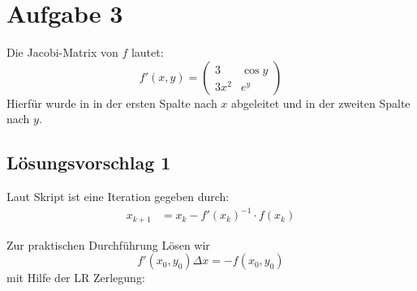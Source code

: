 \section*{Aufgabe 3}
Die Jacobi-Matrix von $f$ lautet:
\[f' (x,y) = \begin{pmatrix}
	3     & \cos y\\
	3 x^2 & e^y
\end{pmatrix}\]
Hierfür wurde in in der ersten Spalte nach $x$ abgeleitet und in der
zweiten Spalte nach $y$.

\subsection*{Lösungsvorschlag 1}
Laut Skript ist eine Iteration gegeben durch:
\begin{align}
x_{k+1}&=x_{k}-f'(x_k)^{-1}\cdot f(x_k)
\end{align}

Zur praktischen Durchführung Lösen wir
\[f'(x_0, y_0)\Delta x = -f(x_0,y_0)\]
mit Hilfe der LR Zerlegung:

